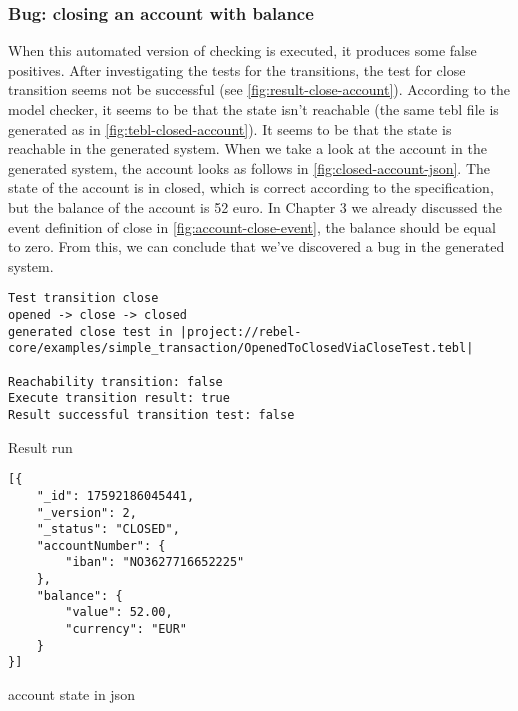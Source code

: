 \subsubsection{Bug: closing an account with balance}
\label{sec:bug-close-account}
When this automated version of checking is executed, it produces some false
positives. After investigating the tests for the transitions, the test for close
transition seems not be successful (see \autoref{fig:result-close-account}).
According to the model checker, it seems to be that the state isn't reachable
(the same tebl file is generated as in \autoref{fig:tebl-closed-account}). It
seems to be that the state is reachable in the generated system. When we take a
look at the account in the generated system, the account looks as follows in
\autoref{fig:closed-account-json}. The state of the account is in closed, which
is correct according to the specification, but the balance of the account is 52
euro. In Chapter 3 we already discussed the event definition of close in
\autoref{fig:account-close-event}, the balance should be equal to zero. From
this, we can conclude that we've discovered a bug in the generated system.



\begin{sourcecode}[h!]
\begin{lstlisting}[]
Test transition close
opened -> close -> closed
generated close test in |project://rebel-core/examples/simple_transaction/OpenedToClosedViaCloseTest.tebl|

Reachability transition: false
Execute transition result: true
Result successful transition test: false
\end{lstlisting}
\caption{Result run}
\label{fig:result-close-account}
\end{sourcecode}

\begin{sourcecode}[h!]
\begin{lstlisting}[]
[{
	"_id": 17592186045441,
	"_version": 2,
	"_status": "CLOSED",
	"accountNumber": {
		"iban": "NO3627716652225"
	},
	"balance": {
		"value": 52.00,
		"currency": "EUR"
	}
}]
\end{lstlisting}
\caption{account state in json}
\label{fig:closed-account-json}
\end{sourcecode}


